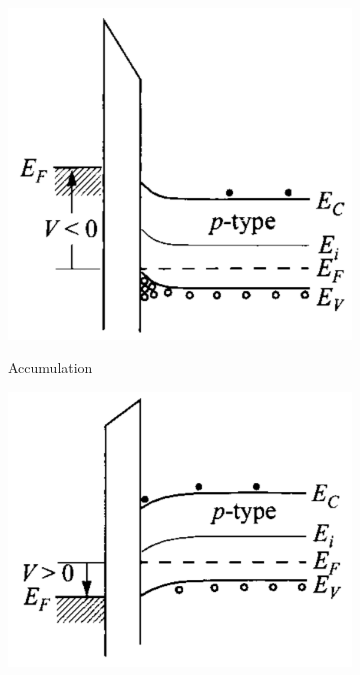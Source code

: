 \begin{figure}[H]
    \centering
    \begin{subfigure}[b]{.3\textwidth}
        \includegraphics{figuras/mos/acumulacion.png}
        \label{fig:mosacumulacion}
        \caption{Accumulation}
    \end{subfigure}
    \begin{subfigure}[b]{.3\textwidth}
        \includegraphics{figuras/mos/desercion.png}

\end{subfigure}
\end{figure}
